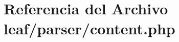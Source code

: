 \hypertarget{leaf_2parser_2content_8php}{\section{Referencia del Archivo leaf/parser/content.php}
\label{leaf_2parser_2content_8php}
}
